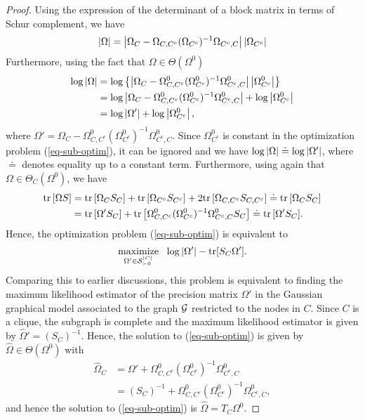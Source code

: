 \begin{proof}
    Using the expression of the determinant of a block matrix in terms of Schur complement, we have
    \begin{equation*}
        \left|\Omega\right| 
        = \left|\Omega_C - \Omega_{C, C^c}(\Omega_{C^c})^{-1}\Omega_{C^c, C}\right| \left|\Omega_{C^c}\right|
    \end{equation*}
    Furthermore, using the fact that $\Omega \in \Theta(\Omega^0)$
    \begin{align*}
        \log \left|\Omega\right|
        &= \log \left\{ \left|\Omega_C - \Omega^0_{C, C^c}(\Omega^0_{C^c})^{-1}\Omega^0_{C^c, C}\right| \left|\Omega^0_{C^c}\right| \right\}\\
        &= \log \left|\Omega_C - \Omega^0_{C, C^c}(\Omega^0_{C^c})^{-1}\Omega^0_{C^c, C}\right| + \log \left|\Omega^0_{C^c}\right|\\
        &= \log \left|\Omega'\right| + \log \left|\Omega^0_{C^c}\right|,
    \end{align*}
    where $\Omega' = \Omega_C - \Omega^0_{C, C^c}(\Omega^0_{C^c})^{-1}\Omega^0_{C^c, C}$. Since $\Omega^0_{C^c}$ is constant in the optimization problem (\ref{eq-sub-optim}), it can be ignored and we have $\log \left|\Omega\right| \doteq \log \left|\Omega'\right|$, where $\doteq$ denotes equality up to a constant term. Furthermore, using again that $\Omega \in \Theta_C(\Omega^0)$, we have
    \begin{align*}
        {\textrm{tr}\left[\Omega S\right]}
        &= {\textrm{tr}\left[\Omega_C S_C\right]} + {\textrm{tr}\left[\Omega_{C^c} S_{C^c}\right]} + 2 {\textrm{tr}\left[\Omega_{C,C^c} S_{C,C^c}\right]} 
        \doteq {\textrm{tr}\left[\Omega_C S_C\right]} \\
        &= {\textrm{tr}\left[\Omega'S_C\right]} + {\textrm{tr}\left[\Omega^0_{C, C^c}(\Omega^0_{C^c})^{-1}\Omega^0_{C^c, C}S_C\right]}
        \doteq  {\textrm{tr}\left[\Omega'S_C\right]}.
    \end{align*}
    Hence, the optimization problem (\ref{eq-sub-optim}) is equivalent to 
    \begin{equation*}
        \underset{\Omega' \in {\mathcal{S}}_{\succ 0}^{|C|}}{\textrm{maximize}}\ \  \log |\Omega'| - {\textrm{tr}}[S_C\Omega'].
    \end{equation*}
    Comparing this to earlier discussions, this problem is equivalent to finding the maximum likelihood estimator of the precision matrix $\Omega'$ in the Gaussian graphical model associated to the graph ${\mathcal{G}}$ restricted to the nodes in $C$. Since $C$ is a clique, the subgraph is complete and the maximum likelihood estimator is given by $\hat\Omega' = (S_C)^{-1}$. Hence, the solution to (\ref{eq-sub-optim}) is given by $\hat\Omega \in \Theta(\Omega^0)$ with
    \begin{align*}
        \hat\Omega_C
        &= \Omega' + \Omega^0_{C, C^c}(\Omega^0_{C^c})^{-1}\Omega^0_{C^c, C}\\
        &= (S_C)^{-1} + \Omega^0_{C, C^c}(\Omega^0_{C^c})^{-1}\Omega^0_{C^c, C},
    \end{align*}
    and hence the solution to (\ref{eq-sub-optim}) is $\hat\Omega = T_C \Omega^0$.
\end{proof}

